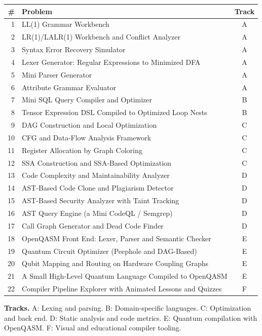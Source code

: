 \documentclass[11pt,a4paper]{article}
\begin{document}
\begin{longtable}{@{}r p{12.5cm} c@{}}
\toprule
\textbf{\#} & \textbf{Problem} & \textbf{Track} \\
\midrule
\endhead
1  & LL(1) Grammar Workbench & A \\
2  & LR(1)/LALR(1) Workbench and Conflict Analyzer & A \\
3  & Syntax Error Recovery Simulator & A \\
4  & Lexer Generator: Regular Expressions to Minimized DFA & A \\
5  & Mini Parser Generator & A \\
6  & Attribute Grammar Evaluator & A \\
7  & Mini SQL Query Compiler and Optimizer & B \\
8  & Tensor Expression DSL Compiled to Optimized Loop Nests & B \\
9  & DAG Construction and Local Optimization & C \\
10 & CFG and Data-Flow Analysis Framework & C \\
11 & Register Allocation by Graph Coloring & C \\
12 & SSA Construction and SSA-Based Optimization & C \\
13 & Code Complexity and Maintainability Analyzer & D \\
14 & AST-Based Code Clone and Plagiarism Detector & D \\
15 & AST-Based Security Analyzer with Taint Tracking & D \\
16 & AST Query Engine (a Mini CodeQL / Semgrep) & D \\
17 & Call Graph Generator and Dead Code Finder & D \\
18 & OpenQASM Front End: Lexer, Parser and Semantic Checker & E \\
19 & Quantum Circuit Optimizer (Peephole and DAG-Based) & E \\
20 & Qubit Mapping and Routing on Hardware Coupling Graphs & E \\
21 & A Small High-Level Quantum Language Compiled to OpenQASM & E \\
22 & Compiler Pipeline Explorer with Animated Lessons and Quizzes & F \\
\bottomrule
\end{longtable}

\textbf{Tracks.} A: Lexing and parsing. B: Domain-specific languages. C: Optimization and back end.
D: Static analysis and code metrics. E: Quantum compilation with OpenQASM. F: Visual and educational compiler tooling.
\end{document}
